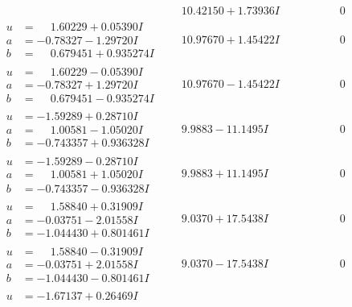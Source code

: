 \documentclass[1p]{elsarticle_modified}
\theoremstyle{definition}
\begin{document}
$$\begin{array}{c|c|c}
 & \phantom{-}10.42150 + 1.73936 I & \phantom{-0.000000 } 0 \\ \hline\begin{aligned}
u &= \phantom{-}1.60229 + 0.05390 I \\
a &= -0.78327 - 1.29720 I \\
b &= \phantom{-}0.679451 + 0.935274 I\end{aligned}
 & \phantom{-}10.97670 + 1.45422 I & \phantom{-0.000000 } 0 \\ \hline\begin{aligned}
u &= \phantom{-}1.60229 - 0.05390 I \\
a &= -0.78327 + 1.29720 I \\
b &= \phantom{-}0.679451 - 0.935274 I\end{aligned}
 & \phantom{-}10.97670 - 1.45422 I & \phantom{-0.000000 } 0 \\ \hline\begin{aligned}
u &= -1.59289 + 0.28710 I \\
a &= \phantom{-}1.00581 - 1.05020 I \\
b &= -0.743357 + 0.936328 I\end{aligned}
 & \phantom{-}9.9883 - 11.1495 I & \phantom{-0.000000 } 0 \\ \hline\begin{aligned}
u &= -1.59289 - 0.28710 I \\
a &= \phantom{-}1.00581 + 1.05020 I \\
b &= -0.743357 - 0.936328 I\end{aligned}
 & \phantom{-}9.9883 + 11.1495 I & \phantom{-0.000000 } 0 \\ \hline\begin{aligned}
u &= \phantom{-}1.58840 + 0.31909 I \\
a &= -0.03751 - 2.01558 I \\
b &= -1.044430 + 0.801461 I\end{aligned}
 & \phantom{-}9.0370 + 17.5438 I & \phantom{-0.000000 } 0 \\ \hline\begin{aligned}
u &= \phantom{-}1.58840 - 0.31909 I \\
a &= -0.03751 + 2.01558 I \\
b &= -1.044430 - 0.801461 I\end{aligned}
 & \phantom{-}9.0370 - 17.5438 I & \phantom{-0.000000 } 0 \\ \hline\begin{aligned}
u &= -1.67137 + 0.26469 I \\

\end{aligned}
\end{array}$$
\end{document}
